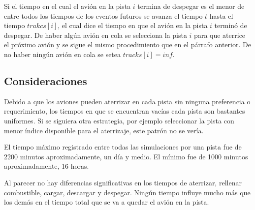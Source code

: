\documentclass[12pt,letterpaper]{article}
\begin{document}
Si el tiempo en el cual el avi\'on en la pista $i$ termina de despegar es el menor de entre todos los tiempos de los eventos futuros se avanza el tiempo $t$ hasta el tiempo $trakcs[i]$, el cual dice el tiempo en que el avi\'on en la pista $i$ termin\'o de despegar. De haber alg\'un avi\'on en cola se selecciona la pista $i$ para que aterrice el pr\'oximo avi\'on y se sigue el mismo procedimiento que en el p\'arrafo anterior. De no haber ning\'un avi\'on en cola se setea $tracks[i] = inf$.

\subsection*{Consideraciones}
Debido a que los aviones pueden aterrizar en cada pista sin ninguna preferencia o requerimiento, los tiempos en que se encuentran vac\'ias cada pista son bastantes uniformes. Si se siguiera otra estrategia, por ejemplo seleccionar la pista con menor \'indice disponible para el aterrizaje, este patr\'on no se ver\'ia.

El tiempo m\'aximo registrado entre todas las simulaciones por una pista fue de 2200 minutos aproximadamente, un d\'ia y medio. El m\'inimo fue de 1000 minutos aproximadamente, 16 horas. 

Al parecer no hay diferencias significativas en los tiempos de aterrizar, rellenar combustible, cargar, descargar y despegar. Ning\'un tiempo influye mucho m\'as que los dem\'as en el tiempo total que se va a quedar el avi\'on en la pista.
\end{document}
